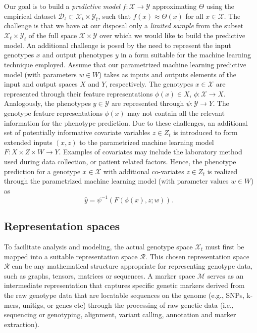 \documentclass[12pt]{article}
\begin{document}
Our goal is to build a {\em predictive model} $f: \mathcal{X} \to \mathcal{Y}$ approximating $\Theta$ using the empirical dataset $\mathcal{D}_t \subset \mathcal{X}_t \times \mathcal{Y}_t$,  such that $f(x) \approx \Theta(x)$ for all $x \in \mathcal{X}$. The challenge is that we have at our disposal only a {\em limited sample} from the subset $\mathcal{X}_t \times \mathcal{Y}_t$ of the full space $\mathcal{X} \times \mathcal{Y}$ over which we would like to build the predictive model. An additional challenge is posed by the need to represent the input genotypes $x$ and output phenotypes $y$ in a form suitable for the machine learning technique employed. Assume that our parametrized machine learning predictive model (with parameters $w \in W$) takes as inputs and outputs elements of the input and output spaces $X$ and $Y$, respectively. The genotypes $x \in \mathcal{X}$ are represented through their feature representations $\phi(x) \in X$, $\phi: \mathcal{X} \to X$. Analogously, the phenotypes $y \in \mathcal{Y}$ are represented through $\psi: \mathcal{Y} \to Y$. The genotype feature representations $\phi(x)$ may not contain all the relevant information for the phenotype prediction. Due to these challenges, an additional set of potentially informative covariate variables $z \in Z_t$ is introduced to form extended inputs $(x,z)$ to the parametrized machine learning model $F: X \times Z \times W \to Y$. Examples of covariates may include the laboratory method used during data collection, or patient related factors. Hence, the phenotype prediction for a genotype $x \in \mathcal{X}$ with additional co-variates $z \in Z_t$ is realized through the parametrized machine learning model (with parameter values $w \in W$) as
\[
\hat y = \psi^{-1}(F(\phi(x),z;w)).
\]


\subsection{Representation spaces} \label{sec:representation_spaces}

To facilitate analysis and modeling, the actual genotype space $\mathcal{X}_t$ must first be mapped into a suitable representation space $\mathcal{R}$. This chosen representation space $\mathcal{R}$ can be any mathematical structure appropriate for representing genotype data, such as graphs, tensors, matrices or sequences. A marker space $\mathcal{M}$ serves as an intermediate representation that captures specific genetic markers derived from the raw genotype data that are locatable sequences on the genome (e.g., SNPs, k-mers, unitigs, or genes etc) through the processing of raw genetic data (i.e., sequencing or genotyping, alignment, variant calling, annotation and marker extraction).
\end{document}
